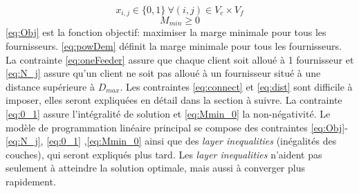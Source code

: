\documentclass[12pt,a4paper]{article}
\begin{document}
\begin{multicols}{2}
\begin{equation}
\begin{aligned}
\end{aligned}
\end{equation}
\begin{equation}\label{eq:0_1}
x_{i,j} \in \{0,1 \} \ \forall (i,j) \in V_{c}\times V_{f}
\end{equation}
\begin{equation}\label{eq:Mmin_0}
M_{min}\geq 0
\end{equation}
\eqref{eq:Obj} est la fonction objectif: maximiser la marge minimale pour tous les fournisseurs. \eqref{eq:powDem} définit la marge minimale pour tous les fournisseurs. La contrainte \eqref{eq:oneFeeder} assure que chaque client soit alloué à 1 fournisseur et \eqref{eq:N_j} assure qu'un client ne soit pas alloué à un fournisseur situé à une distance supérieure à $D_{max}$. Les contraintes \eqref{eq:connect} et \eqref{eq:dist} sont difficile à imposer, elles seront expliquées en détail dans la section à suivre. La contrainte \eqref{eq:0_1} assure l'intégralité de solution et \eqref{eq:Mmin_0} la non-négativité.\newline \indent
Le modèle de programmation linéaire principal se compose des contraintes \eqref{eq:Obj}-\eqref{eq:N_j}, \eqref{eq:0_1} ,\eqref{eq:Mmin_0} ainsi que des \textit{layer inequalities} (inégalités des couches), qui seront expliqués plus tard. Les \textit{layer inequalities} n'aident pas seulement à atteindre la solution optimale, mais aussi à converger plus rapidement.

\end{multicols}
\end{document}
